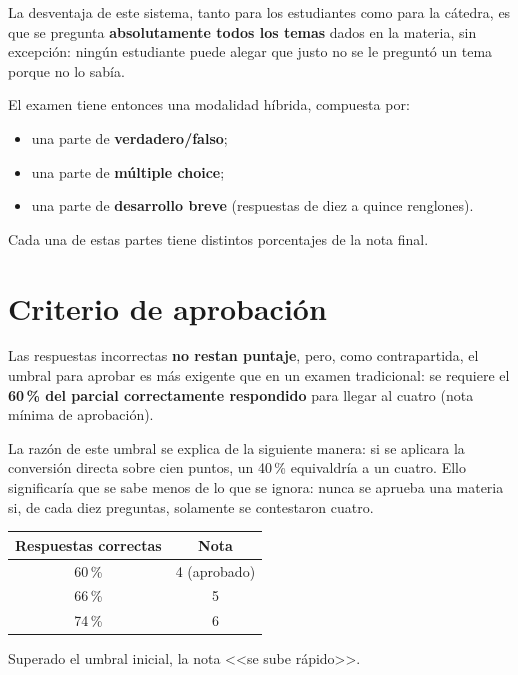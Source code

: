 \documentclass[12pt,oneside]{book}
\begin{document}
La desventaja de este sistema, tanto para los estudiantes como para la cátedra, es que se pregunta \textbf{absolutamente todos los temas} dados en la materia, sin excepción: ningún estudiante puede alegar que justo no se le preguntó un tema porque no lo sabía.

El examen tiene entonces una modalidad híbrida, compuesta por:

\begin{itemize}
    \item una parte de \textbf{verdadero/falso};
    \item una parte de \textbf{múltiple choice};
    \item una parte de \textbf{desarrollo breve} (respuestas de diez a quince renglones).
\end{itemize}

Cada una de estas partes tiene distintos porcentajes de la nota final.

\section{Criterio de aprobación}

\begin{important}
Las respuestas incorrectas \textbf{no restan puntaje}, pero, como contrapartida, el umbral para aprobar es más exigente que en un examen tradicional: se requiere el \textbf{60\,\% del parcial correctamente respondido} para llegar al cuatro (nota mínima de aprobación).
\end{important}

La razón de este umbral se explica de la siguiente manera: si se aplicara la conversión directa sobre cien puntos, un 40\,\% equivaldría a un cuatro. Ello significaría que se sabe menos de lo que se ignora: nunca se aprueba una materia si, de cada diez preguntas, solamente se contestaron cuatro.

\begin{table}[H]
\centering
\small
\begin{tabular}{cc}
\toprule
\textbf{Respuestas correctas} & \textbf{Nota} \\
\midrule
60\,\% & 4 (aprobado) \\
66\,\% & 5 \\
74\,\% & 6 \\
\bottomrule
\end{tabular}
\end{table}

Superado el umbral inicial, la nota <<se sube rápido>>.
\end{document}
